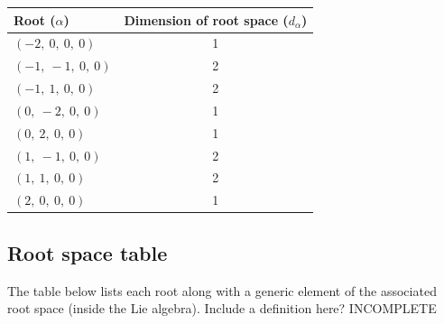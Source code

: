 \documentclass[11pt]{article}
\newcommand{\noi}{\noindent}
\theoremstyle{definition}
\begin{document}
\bigskip

\noindent \begin{tabular}{|l|c|}
    \hline
    \textbf{Root ($\alpha$)} & \textbf{Dimension of root space ($d_{\alpha}$)} \\
    \hline
    $\left( -2, \  0, \  0, \  0\right)$ & 1 \\
    \hline
    $\left( -1, \  -1, \  0, \  0\right)$ & 2 \\
    \hline
    $\left( -1, \  1, \  0, \  0\right)$ & 2 \\
    \hline
    $\left( 0, \  -2, \  0, \  0\right)$ & 1 \\
    \hline
    $\left( 0, \  2, \  0, \  0\right)$ & 1 \\
    \hline
    $\left( 1, \  -1, \  0, \  0\right)$ & 2 \\
    \hline
    $\left( 1, \  1, \  0, \  0\right)$ & 2 \\
    \hline
    $\left( 2, \  0, \  0, \  0\right)$ & 1 \\
    \hline
\end{tabular}


\subsection{Root space table}

\noi The table below lists each root along with a generic element of the associated root space (inside the Lie algebra). Include a definition here? INCOMPLETE

\bigskip
\end{document}
